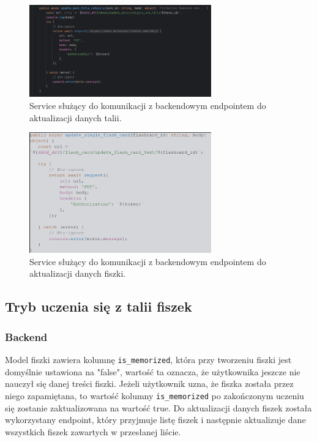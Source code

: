 \begin{figure}[H]
    \centering
    \includegraphics[width=0.7\textwidth]{chapters/chapter_8/screens/update_deck_web}
    \caption{Service służący do komunikacji z backendowym endpointem do aktualizacji danych talii.}
    \label{img:update_deck_web}
\end{figure}

\begin{figure}[H]
    \centering
    \includegraphics[width=0.7\textwidth]{chapters/chapter_8/screens/update_flash_card_text_web}
    \caption{Service służący do komunikacji z backendowym endpointem do aktualizacji danych fiszki.}
    \label{img:update_flash_card_web}
\end{figure}

\subsection{Tryb uczenia się z talii fiszek}

\subsubsection{Backend}

Model fiszki zawiera kolumnę \texttt{is\_memorized}, która przy tworzeniu fiszki jest domyślnie ustawiona na "false", wartość ta oznacza, że użytkownika jeszcze nie nauczył się danej treści fiszki. Jeżeli użytkownik uzna, że fiszka została przez niego zapamiętana, to wartość kolumny \texttt{is\_memorized} po zakończonym uczeniu się zostanie zaktualizowana na wartość true. Do aktualizacji danych fiszek została wykorzystany endpoint, który przyjmuje listę fiszek i następnie aktualizuje dane wszystkich fiszek zawartych w przesłanej liście.

